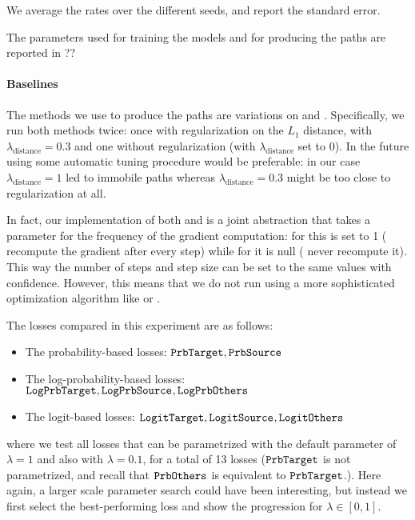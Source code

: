 \documentclass[../main.tex]{subfiles}
\begin{document}
We average the rates over the different seeds, and report the standard error.

The parameters used for training the models and for producing the paths are reported in ?? 

\paragraph{Baselines}

The methods we use to produce the paths are variations on \ls{} and \revise{}.
Specifically, we run both methods twice: once with regularization on the $L_1$ distance, with $\lambda_\text{distance} = 0.3$ and one without regularization (with $\lambda_\text{distance}$ set to 0).
In the future using some automatic tuning procedure would be preferable: in our case $\lambda_\text{distance} = 1$ led to immobile paths whereas $\lambda_\text{distance} = 0.3$ might be too close to regularization at all.

In fact, our implementation of both \ls{} and \revise{} is a joint abstraction that takes a parameter for the frequency of the gradient computation: for \revise{} this is set to 1 (\ie{} recompute the gradient after every step) while for \revise{} it is null (\ie{} never recompute it).
This way the number of steps and step size can be set to the same values with confidence.
However, this means that we do not run \revise{} using a more sophisticated optimization algorithm like  or .

The losses compared in this experiment are as follows:
\begin{itemize}
    \item The probability-based losses: $\mathtt{PrbTarget}, \mathtt{PrbSource}_{}$
    \item The log-probability-based losses: $\mathtt{LogPrbTarget}, \mathtt{LogPrbSource}_{}, \mathtt{LogPrbOthers}_{}$
    \item The logit-based losses: $\mathtt{LogitTarget}, \mathtt{LogitSource}_{}, \mathtt{LogitOthers}_{}$
\end{itemize}
where we test all losses that can be parametrized with the default parameter of $\lambda = 1$ and also with $\lambda = 0.1$, for a total of 13 losses ($\mathtt{PrbTarget}$ is not parametrized, and recall that $\mathtt{PrbOthers}_{}$ is equivalent to $\mathtt{PrbTarget}$.).
Here again, a larger scale parameter search could have been interesting, but instead we first select the best-performing loss and show the progression for $\lambda \in [0, 1]$.
\end{document}
